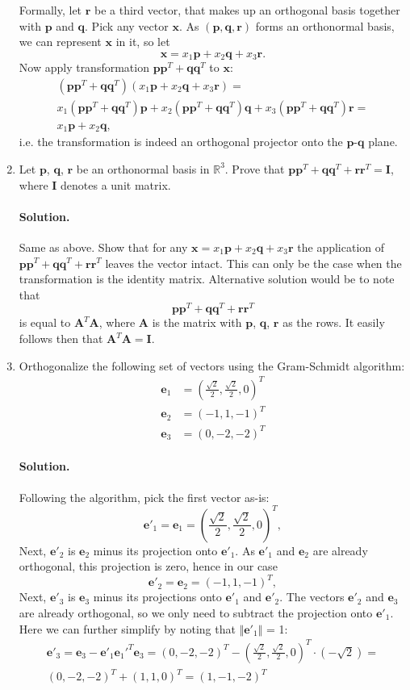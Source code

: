 \documentclass{article}
\newcommand{\bbR}{\mathbb{R}}
\newcommand{\bx}{\mathbf{x}}
\newcommand{\bq}{\mathbf{q}}
\newcommand{\be}{\mathbf{e}}
\newcommand{\br}{\mathbf{r}}
\newcommand{\bp}{\mathbf{p}}
\newcommand{\bI}{\mathbf{I}}
\begin{document}
\begin{enumerate}
Formally, let $\br$ be a third vector, that makes up an orthogonal basis together with $\bp$ and $\bq$. Pick any vector $\bx$. As $(\bp, \bq, \br)$ forms an orthonormal basis, we can represent $\bx$ in it, so let
$$
\bx = x_1\bp + x_2 \bq + x_3 \br.
$$
Now apply transformation $\bp\bp^T + \bq\bq^T$ to $\bx$:
\begin{multline*}
(\bp\bp^T + \bq\bq^T)(x_1\bp + x_2 \bq + x_3 \br) = \\x_1(\bp\bp^T + \bq\bq^T)\bp + x_2(\bp\bp^T + \bq\bq^T)\bq + x_3(\bp\bp^T + \bq\bq^T)\br = \\
x_1\bp + x_2\bq,
\end{multline*}
i.e. the transformation is indeed an orthogonal projector onto the $\bp$-$\bq$ plane.

\item Let $\bp$, $\bq$, $\br$ be an orthonormal basis in $\bbR^3$. Prove that $\bp\bp^T + \bq\bq^T + \br\br^T = \bI$, where $\bI$ denotes a unit matrix.

\paragraph{Solution.} Same as above. Show that for any $\bx = x_1\bp + x_2\bq + x_3 \br$ the application of $\bp\bp^T + \bq\bq^T + \br\br^T$ leaves the vector intact. This can only be the case when the transformation is the identity matrix. Alternative solution would be to note that
$$
\bp\bp^T + \bq\bq^T + \br\br^T
$$
is equal to $\mathbf{A}^T\mathbf{A}$, where $\mathbf{A}$ is the matrix with $\bp$, $\bq$, $\br$ as the rows. It easily follows then that $\mathbf{A}^T\mathbf{A} = \bI$.

\item Orthogonalize the following set of vectors using the Gram-Schmidt algorithm:
\begin{align*}
 \be_1 &= (\frac{\sqrt{2}}{2},\frac{\sqrt{2}}{2},0)^T \\
 \be_2 &= (-1, 1, -1)^T \\
 \be_3 &= (0, -2, -2)^T 
\end{align*}

\paragraph{Solution.}
Following the algorithm, pick the first vector as-is:
$$
 \be'_1 = \be_1 = (\frac{\sqrt{2}}{2},\frac{\sqrt{2}}{2},0)^T,
$$
Next, $\be'_2$ is $\be_2$ minus its projection onto $\be'_1$. As $\be'_1$ and $\be_2$ are already orthogonal, this projection is zero, hence in our case
$$
 \be'_2 = \be_2 = (-1, 1, -1)^T,
$$
Next, $\be'_3$ is $\be_3$ minus its projections onto $\be'_1$ and $\be'_2$. The vectors $\be'_2$ and $\be_3$ are already orthogonal, so we only need to subtract the projection onto $\be'_1$. Here we can further simplify by noting that $\Vert\be'_1\Vert$ = 1:
\begin{multline*}
 \be'_3 = \be_3 - \be'_1\be_1'^T\be_3 = (0, -2, -2)^T -  (\frac{\sqrt{2}}{2},\frac{\sqrt{2}}{2},0)^T \cdot (-\sqrt{2}) = \\
(0, -2, -2)^T + (1, 1, 0)^T = (1, -1, -2)^T
\end{multline*}


\end{enumerate}
\end{document}
